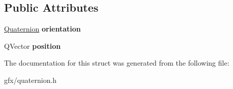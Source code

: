 \subsection*{Public Attributes}
\begin{DoxyCompactItemize}
\item 
\hyperlink{structQuaternion}{Quaternion} {\bfseries orientation}\hypertarget{structTransformation_a77070b8ef83beabbeacbfb8eaef70415}{}\label{structTransformation_a77070b8ef83beabbeacbfb8eaef70415}

\item 
Q\+Vector {\bfseries position}\hypertarget{structTransformation_a6b1c3e965ef5c50fac7040294ba53cc5}{}\label{structTransformation_a6b1c3e965ef5c50fac7040294ba53cc5}

\end{DoxyCompactItemize}


The documentation for this struct was generated from the following file\+:\begin{DoxyCompactItemize}
\item 
gfx/quaternion.\+h\end{DoxyCompactItemize}
